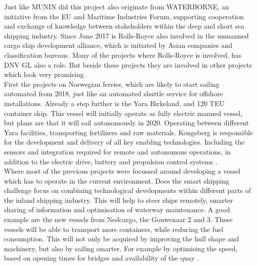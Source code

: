 Just like MUNIN did this project also originate from WATERBORNE, an initiative from the EU and Maritime Industries Forum, supporting cooperation and exchange of knowledge between stakeholders within the deep and short sea shipping industry. Since June 2017 is Rolls-Royce also involved in the unmanned cargo ship development alliance, which is initiated by Asian companies and classification bureaus. Many of the projects where Rolls-Royce is involved, has DNV GL also a role. But beside these projects they are involved in other projects which look very promising.\\

First the projects on Norwegian ferries, which are likely to start sailing automated from 2018, just like an automated shuttle service for offshore installations. 
Already a step further is the Yara Birkeland, and 120 \ac{TEU} container ship. This vessel will initially operate as fully electric manned vessel, but plans are that it will sail autonomously in 2020. Operating between different Yara facilities, transporting fertilizers and raw materials. 
Kongsberg is responsible for the development and delivery of all key enabling technologies. Including the sensors and integration required for remote and autonomous operations, in addition to the electric drive, battery and propulsion control systems \cite{Sames2017}. \\

Where most of the previous projects were focussed around developing a vessel which has to operate in the current environment. Does the smart shipping challenge focus on combining technological developments within different parts of the inland shipping industry. This will help to steer ships remotely, smarter sharing of information and optimisation of waterway maintenance.
A good example are the new vessels from Nedcargo, the Gouwenaar 2 and 3. These vessels will be able to transport more containers, while reducing the fuel consumption. This will not only be acquired by improving the hull shape and machinery, but also by sailing smarter. For example by optimising the speed, based on opening times for bridges and availability of the quay \cite{SMASH2017}. \\ 

